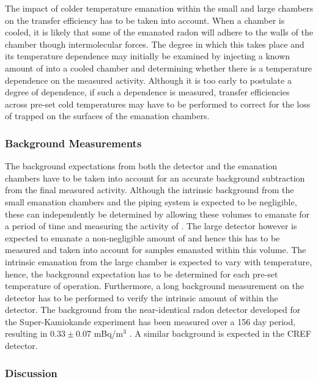 The impact of colder temperature emanation within the small and large chambers on the transfer efficiency has to be taken into account. When a chamber is cooled, it is likely that some of the emanated radon will adhere to the walls of the chamber though intermolecular forces. The degree in which this takes place and its temperature dependence may initially be examined by injecting a known amount of \RnTTT{} into a cooled chamber and determining whether there is a temperature dependence on the measured activity. Although it is too early to postulate a degree of dependence, if such a dependence is measured, transfer efficiencies across pre-set cold temperatures may have to be performed to correct for the loss of \RnTTT{} trapped on the surfaces of the emanation chambers. 


\subsubsection{Background Measurements}

The background expectations from both the detector and the emanation chambers have to be taken into account for an accurate background subtraction from the final measured activity. Although the intrinsic \RnTTT{} background from the small emanation chambers and the piping system is expected to be negligible, these can independently be determined by allowing these volumes to emanate for a period of time and measuring the activity of \RnTTT{}. The large detector however is expected to emanate a non-negligible amount of \RnTTT{} and hence this has to be measured and taken into account for samples emanated within this volume. The intrinsic emanation from the large chamber is expected to vary with temperature, hence, the background expectation has to be determined for each pre-set temperature of operation. Furthermore, a long background measurement on the detector has to be performed to verify the intrinsic amount of \RnTTT{} within the detector. The background from the near-identical radon detector developed for the Super-Kamiokande experiment has been measured over a 156 day period, resulting in $0.33 \pm 0.07$ mBq/m$^{3}$ \cite{Nakano:2017rsy}. A similar background is expected in the CREF detector.


\subsubsection{Discussion}


